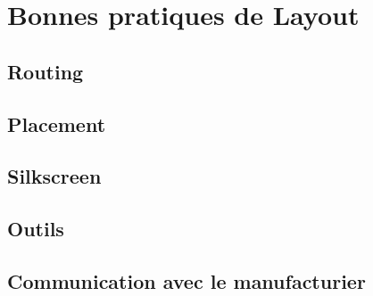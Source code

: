
\section{Bonnes pratiques de Layout}

\subsection{Routing}

\subsection{Placement}

\subsection{Silkscreen}

\subsection{Outils}

\subsection{Communication avec le manufacturier}

